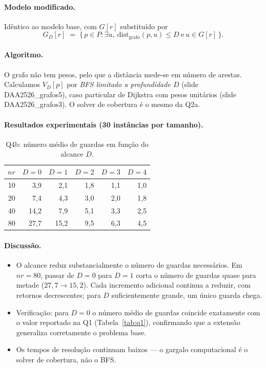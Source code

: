\documentclass[11pt,a4paper]{article}
\begin{document}
\paragraph{Modelo modificado.} Idêntico ao modelo base, com
$G[r]$ substituído por
\[
  G_D[r] \;=\; \{\, p \in P : \exists u,\ \text{dist}_{\text{grafo}}(p,u) \le D
  \ \text{e}\ u \in G[r]\,\}.
\]

\paragraph{Algoritmo.} O grafo não tem pesos, pelo que a distância
mede-se em número de arestas. Calculamos $V_D[p]$ por
\emph{BFS limitado a profundidade $D$} (slide DAA2526\_grafos5),
caso particular de Dijkstra com pesos unitários
(slide DAA2526\_grafos3). O solver de cobertura é o mesmo da Q2a.

\paragraph{Resultados experimentais (30 instâncias por tamanho).}
\begin{table}[h]
\centering
\small
\begin{tabular}{rrrrrr}
\toprule
$nr$ & $D=0$ & $D=1$ & $D=2$ & $D=3$ & $D=4$ \\
\midrule
 10 & 3{,}9 & 2{,}1 & 1{,}8 & 1{,}1 & 1{,}0 \\
 20 & 7{,}4 & 4{,}3 & 3{,}0 & 2{,}0 & 1{,}8 \\
 40 & 14{,}2 & 7{,}9 & 5{,}1 & 3{,}3 & 2{,}5 \\
 80 & 27{,}7 & 15{,}2 & 9{,}5 & 6{,}3 & 4{,}5 \\
\bottomrule
\end{tabular}
\caption{Q4b: número médio de guardas em função do alcance $D$.}
\label{tab:q4b}
\end{table}

\paragraph{Discussão.}
\begin{itemize}[topsep=2pt,itemsep=0pt]
  \item O alcance reduz substancialmente o número de guardas
    necessários. Em $nr=80$, passar de $D=0$ para $D=1$ corta o
    número de guardas quase para metade ($27{,}7 \to 15{,}2$).
    Cada incremento adicional continua a reduzir, com retornos
    decrescentes; para $D$ suficientemente grande, um único
    guarda chega.

  \item Verificação: para $D=0$ o número médio de guardas coincide
    exatamente com o valor reportado na Q1 (Tabela~\ref{tab:q1}),
    confirmando que a extensão generaliza corretamente o problema
    base.

  \item Os tempos de resolução continuam baixos
    --- o gargalo computacional é o solver de cobertura, não o BFS.
\end{itemize}
\end{document}
